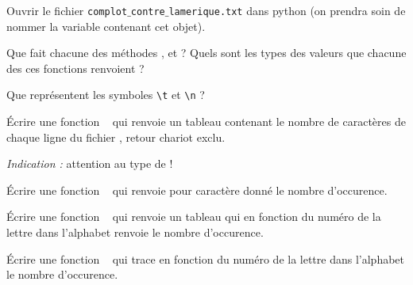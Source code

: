 Ouvrir le fichier \texttt{complot$\_$contre$\_$lamerique.txt} dans python (on prendra soin de nommer la variable contenant cet objet). 

\question{} Que fait chacune des méthodes  ,  et  ? Quels sont les types des valeurs que chacune des ces fonctions renvoient ? 

\question{} Que représentent les symboles \texttt{\textbackslash t} et \texttt{\textbackslash n} ?


\question{} \'Ecrire une fonction \python\  qui renvoie un tableau contenant le nombre de caractères de chaque ligne du fichier , retour chariot exclu. 

\emph{Indication :} attention au type de  !

\question{} \'Ecrire une fonction \python\  qui renvoie pour caractère donné le nombre d'occurence.

\question{} \'Ecrire une fonction \python\  qui renvoie un tableau qui en fonction du numéro de la lettre dans l'alphabet renvoie le nombre d'occurence.

\question{ } \'Ecrire une fonction \python\  qui trace en fonction du numéro de la lettre dans l'alphabet le nombre d'occurence.
